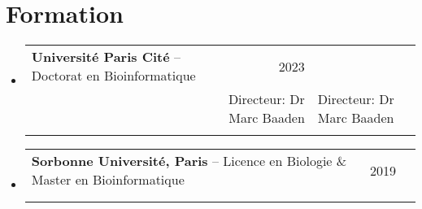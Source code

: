 \documentclass[a4paper,11pt]{article}
\makeatletter
\newcommand{\resumeItem}[1]{
  \item \begin{minipage}[t]{0.98\textwidth}
    \raggedright #1
  \end{minipage}\vspace{-2pt}
}
\newcommand{\resumeSubheadingBis}[4]{
  \vspace{-1pt}\item
    \begin{tabular*}{\textwidth}[t]{l@{\extracolsep{\fill}}r}
      \textbf{#1} & \textit{#2} \\
      \textit{#3}
    \end{tabular*}
    \begin{minipage}[t]{0.85\textwidth} #4 \end{minipage} \vspace{-2pt}
    \vspace{2pt}
}
\newcommand{\resumeSubSubheading}[2]{
    \begin{tabular*}{0.97\textwidth}{l@{\extracolsep{\fill}}r}
      \textit{#1} & \textit{#2} \\
    \end{tabular*}\vspace{-5pt}
}
\newcommand{\resumeSubHeadingListStart}{\begin{itemize}[leftmargin=0pt, label={}, itemsep=0pt]}
\newcommand{\resumeSubHeadingListEnd}{\end{itemize}}
\newcommand{\resumeItemListStart}{\begin{itemize}[leftmargin=*, label={\sbt}]}
\newcommand{\resumeItemListEnd}{\end{itemize}\vspace{-5pt}}
\newcommand{\sbt}{\,\begin{picture}(-1,1)(-1,-3)\circle*{3}\end{picture}\ }
\makeatother
\begin{document}




\newcommand{\resumeSubheadingEducation}[4]{
  \vspace{-1pt}\item
    \begin{tabular*}{\textwidth}[t]{l@{\extracolsep{\fill}}r}
      \textbf{#1} -- #2 & #3 \\
      \ifx&#4&\else #4 \\ \fi
    \end{tabular*}\vspace{-7pt}
}

\section{Formation}
  \resumeSubHeadingListStart
    \resumeSubheadingEducation
      {Université Paris Cité}{Doctorat en Bioinformatique}{ 2023}
      { Directeur: Dr Marc Baaden}
      
    \resumeSubheadingEducation
        {Sorbonne Université, Paris}{Licence en Biologie \& Master en Bioinformatique}{ 2019}
      {}
      
    \resumeSubHeadingListEnd

\nocite{*}
\printbibliography[title=Publications, nottype=cited]
\end{document}

